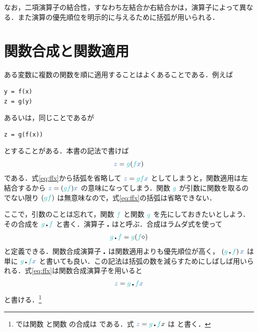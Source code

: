 \documentclass[a5paper,twoside,fleqn,draft]{jsbook}
\begin{document}
なお，二項演算子の結合性，すなわち左結合か右結合かは，演算子によって異なる．また演算の優先順位を明示的に与えるために括弧が用いられる．

\section{関数合成と関数適用}

ある変数に複数の関数を順に適用することはよくあることである．例えば
\begin{pythoncode}
\begin{verbatim}
y = f(x)
z = g(y)
\end{verbatim}
\end{pythoncode}
あるいは，同じことであるが
\begin{pythoncode}
\begin{verbatim}
z = g(f(x))
\end{verbatim}
\end{pythoncode}
とすることがある．本書の記法で書けば
\begin{equation}
  \label{eq:ffx}
  \hVar{z}=
  \hFunc{g}(\hFunc{f}\hVar{x})
\end{equation}
である．式\eqref{eq:ffx}から括弧を省略して $\hVar{z}=\hFunc{g}\hFunc{f}\hVar{x}$ としてしまうと，関数適用は左結合するから $\hVar{z}=(\hFunc{g}\hFunc{f})\hVar{x}$ の意味になってしまう．関数 $\hFunc{g}$ が引数に関数を取るのでない限り $(\hFunc{g}\hFunc{f})$ は無意味なので，式\eqref{eq:ffx}の括弧は省略できない．

ここで，引数のことは忘れて，関数 $\hFunc{f}$ と関数 $\hFunc{g}$ を先にしておきたいとしよう．その合成を $\hFunc{g}\hCompose\hFunc{f}$ と書く．演算子 $\operatorname{\centerdot}$ はと呼ぶ．合成はラムダ式を使って
\begin{equation}
  \hFunc{g}\hCompose \hFunc{f}
  =\hFunc{g}(\hFunc{f}\hAnonParam)
\end{equation}
と定義できる．関数合成演算子 $\operatorname{\centerdot}$ は関数適用よりも優先順位が高く， $\left(\hFunc{g}\hCompose \hFunc{f}\right)\hVar{x}$ は単に $\hFunc{g}\hCompose\hFunc{f}\hVar{x}$ と書いても良い．この記法は括弧の数を減らすためにしばしば用いられる．式\eqref{eq:ffx}は関数合成演算子を用いると
\begin{equation}
  \hVar{z}
  =\hFunc{g}\hCompose\hFunc{f}\hVar{x}
\end{equation}
と書ける．\footnote{\haskell では関数  と関数  の合成は  である．式 $\hVar{z}=\hFunc{g}\hCompose \hFunc{f} x$ は  と書く．}
\end{document}
